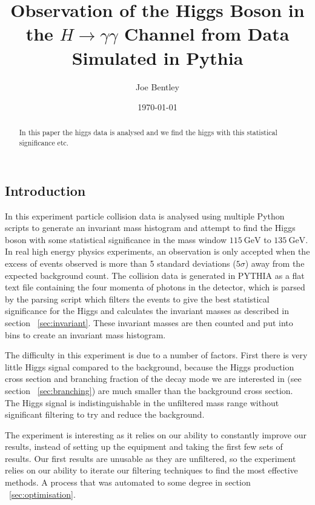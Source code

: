 \documentclass[11pt]{amsart}
\title{Observation of the Higgs Boson in the $H \to \gamma\gamma$ Channel from Data Simulated in Pythia}
\author{Joe Bentley}
\date{\today}
\begin{document}
\begin{abstract}
  In this paper the higgs data is analysed and we find the higgs with this statistical significance etc.
\end{abstract}

\maketitle

\newpage

\pagestyle{fancyplain}


\begin{multicols}{2}

\section{Introduction}

In this experiment particle collision data is analysed using multiple Python scripts to generate an invariant mass histogram and attempt to find the Higgs boson with some statistical significance in the mass window $\SI{115}{\giga\electronvolt}$ to $\SI{135}{\giga\electronvolt}$. In real high energy physics experiments, an observation is only accepted when the excess of events observed is more than 5 standard deviations ($5\sigma$) away from the expected background count. \cite{5sigma} The collision data is generated in PYTHIA as a flat text file containing the four momenta of photons in the detector, which is parsed by the parsing script which filters the events to give the best statistical significance for the Higgs and calculates the invariant masses as described in section ~\ref{sec:invariant}. These invariant masses are then counted and put into bins to create an invariant mass histogram.

The difficulty in this experiment is due to a number of factors. First there is very little Higgs signal compared to the background, because the Higgs production cross section and branching fraction of the decay mode we are interested in (see section ~\ref{sec:branching}) are much smaller than the background cross section. The Higgs signal is indistinguishable in the unfiltered mass range without significant filtering to try and reduce the background.

The experiment is interesting as it relies on our ability to constantly improve our results, instead of setting up the equipment and taking the first few sets of results. Our first results are unusable as they are unfiltered, so the experiment relies on our ability to iterate our filtering techniques to find the most effective methods. A process that was automated to some degree in section ~\ref{sec:optimisation}.


\end{multicols}
\end{document}
